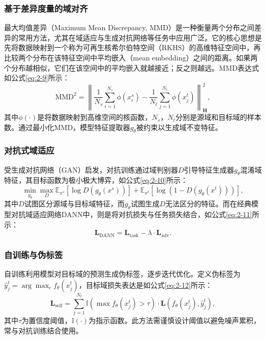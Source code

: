 \subsubsection{基于差异度量的域对齐}
最大均值差异（Maximum Mean Discrepancy, MMD）是一种衡量两个分布之间差异的常用方法，尤其在域适应与生成对抗网络等任务中应用广泛。它的核心思想是先将数据映射到一个称为可再生核希尔伯特空间（RKHS）的高维特征空间中，再比较两个分布在该特征空间中平均嵌入（mean embedding）之间的距离。如果两个分布越相似，它们在该空间中的平均嵌入就越接近；反之则越远。MMD表达式如公式\eqref{eq:2-9}所示：
\begin{equation}
    \label{eq:2-9}
    \text{MMD}^2 = \left\| \frac{1}{N_s} \sum_{i=1}^{N_s} \phi(x_i^s) - \frac{1}{N_t} \sum_{j=1}^{N_t} \phi(x_j^t) \right\|_{\mathbf{H}}^2,
\end{equation}
其中$\phi(\cdot)$是将数据映射到高维空间的核函数，$N_s$，$N_t$分别是源域和目标域的样本数。通过最小化MMD，模型特征提取器$g_\theta$被约束以生成域不变特征。%
\subsubsection{对抗式域适应}
受生成对抗网络（GAN）启发，对抗训练通过域判别器$D$引导特征生成器$g_\theta$混淆域特征，其目标函数为极小极大博弈，如公式\eqref{eq:2-10}所示：
\begin{equation}
    \label{eq:2-10}
    \min_{g_\theta} \max_{D} \mathbb{E}_{x^s}[\log D(g_\theta(x^s))] + \mathbb{E}_{x^t}[\log (1 - D(g_\theta(x^t)))],
\end{equation}
其中$D$试图区分源域与目标域特征，而$g_\theta$试图生成$D$无法区分的特征。而在经典模型对抗域适应网络DANN中，则是将对抗损失与任务损失结合，如公式\eqref{eq:2-11}所示：
\begin{equation}
    \label{eq:2-11}
    \mathbf{L}_{\text{DANN}} = \mathbf{L}_{\text{task}} - \lambda \cdot \mathbf{L}_{\text{adv}}.
\end{equation}

\subsubsection{自训练与伪标签}
自训练利用模型对目标域的预测生成伪标签，逐步迭代优化。定义伪标签为$\hat{y}_j^t = \arg\max_c f_\theta(x_j^t)$，目标域损失表达是如公式\eqref{eq:2-12}所示：
\begin{equation}
    \label{eq:2-12}
    \mathbf{L}_{\text{self}} = \sum_{j=1}^{N_t} \mathbb{I}(\max f_\theta(x_j^t) > \tau) \cdot \mathbf{L}(f_\theta(x_j^t), \hat{y}_j^t),
\end{equation}
其中$\tau$为置信度阈值，$\mathbb{I}(\cdot)$为指示函数。此方法需谨慎设计阈值以避免噪声累积，常与对抗训练结合使用。

